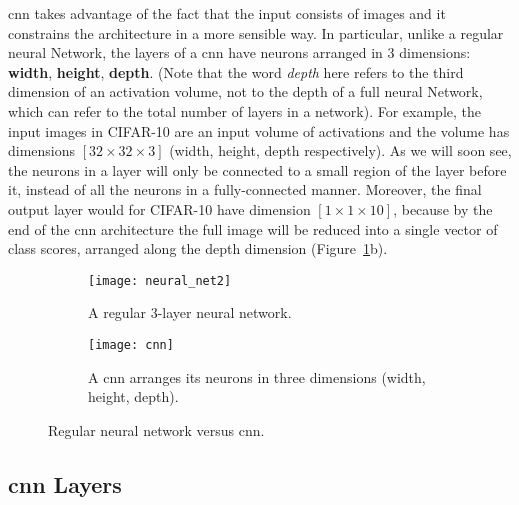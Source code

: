 \acrlong{cnn} takes advantage of the fact that the input consists of images and
it constrains the architecture in a more sensible way. In particular, unlike a
regular neural Network, the layers of a \acrshort{cnn} have neurons arranged in
3 dimensions: \textbf{width}, \textbf{height}, \textbf{depth}. (Note that the
word \emph{depth} here refers to the third dimension of an activation volume,
not to the depth of a full neural Network, which can refer to the total number
of layers in a network). For example, the input images in CIFAR-10 are an input
volume of activations and the volume has dimensions $[32\times32\times3]$ (width,
height, depth respectively). As we will soon see, the neurons in a layer will
only be connected to a small region of the layer before it, instead of all the
neurons in a fully-connected manner. Moreover, the final output layer would for
CIFAR-10 have dimension $[1\times1\times10]$, because by the end of the
\acrshort{cnn} architecture the full image will be reduced into a single vector
of class scores, arranged along the depth dimension
(Figure~\ref{fig:nn_vs_cnn}b).
\begin{figure}[h]
    \centering
    \begin{subfigure}[b]{0.495\linewidth}
        \texttt{[image: neural\_net2]}
        \caption{A regular 3-layer neural network.}
    \end{subfigure}
    \begin{subfigure}[b]{0.495\linewidth}
        \texttt{[image: cnn]}
        \caption{
            A \acrshort{cnn} arranges its neurons in three dimensions (width,
            height, depth).
        }
    \end{subfigure}
    \caption{Regular neural network versus \acrlong{cnn}.}
    \label{fig:nn_vs_cnn}
\end{figure}

\subsection{\acrshort{cnn} Layers}
